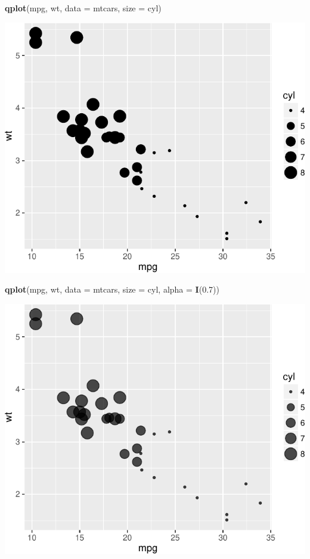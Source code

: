 \documentclass[]{article}
\newenvironment{Shaded}{\begin{snugshade}}{\end{snugshade}}
\newcommand{\KeywordTok}[1]{\textcolor[rgb]{0.13,0.29,0.53}{\textbf{{#1}}}}
\newcommand{\DataTypeTok}[1]{\textcolor[rgb]{0.13,0.29,0.53}{{#1}}}
\newcommand{\FloatTok}[1]{\textcolor[rgb]{0.00,0.00,0.81}{{#1}}}
\newcommand{\NormalTok}[1]{{#1}}
\numberwithin{equation}{section}
\begin{document}
\begin{Shaded}
\begin{Highlighting}[]
\KeywordTok{qplot}\NormalTok{(mpg, wt, }\DataTypeTok{data =} \NormalTok{mtcars, }\DataTypeTok{size =} \NormalTok{cyl)}
\end{Highlighting}
\end{Shaded}

\includegraphics{index_files/figure-latex/unnamed-chunk-235-4.pdf}

\begin{Shaded}
\begin{Highlighting}[]
\KeywordTok{qplot}\NormalTok{(mpg, wt, }\DataTypeTok{data =} \NormalTok{mtcars, }\DataTypeTok{size =} \NormalTok{cyl, }\DataTypeTok{alpha =} \KeywordTok{I}\NormalTok{(}\FloatTok{0.7}\NormalTok{))}
\end{Highlighting}
\end{Shaded}

\includegraphics{index_files/figure-latex/unnamed-chunk-235-5.pdf}
\end{document}
